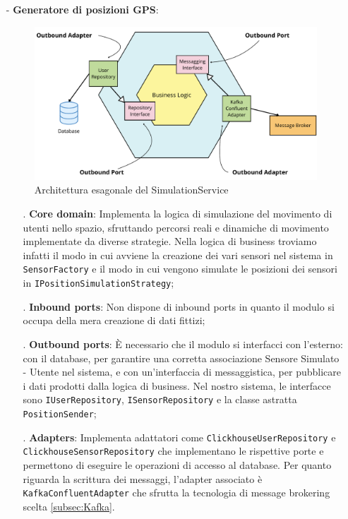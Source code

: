 \documentclass[10pt]{article}
\begin{document}
    \begin{itemize}
        \item[-] \textbf{Generatore di posizioni GPS}:
        \begin{figure}[h]
        \centering
        \includegraphics[width=\textwidth]{SimulationService.pdf}
        \caption{Architettura esagonale del SimulationService}
        \end{figure}
        \begin{itemize}
            \item[.] \textbf{Core domain}: Implementa la logica di simulazione del movimento di utenti nello spazio, sfruttando percorsi reali e dinamiche di movimento implementate da diverse strategie. Nella logica di business troviamo infatti il modo in cui avviene la creazione dei vari sensori nel sistema in \texttt{SensorFactory} e il modo in cui vengono simulate le posizioni dei sensori in \texttt{IPositionSimulationStrategy};
            \item[.] \textbf{Inbound ports}: Non dispone di inbound ports in quanto il modulo si occupa della mera creazione di dati fittizi;
            \item[.] \textbf{Outbound ports}: È necessario che il modulo si interfacci con l'esterno: con il database, per garantire una corretta associazione Sensore Simulato - Utente nel sistema, e con un'interfaccia di messaggistica, per pubblicare i dati prodotti dalla logica di business. Nel nostro sistema, le interfacce sono \texttt{IUserRepository}, \texttt{ISensorRepository} e la classe astratta \texttt{PositionSender};
            \sloppy
            \item[.] \textbf{Adapters}: Implementa adattatori come \texttt{ClickhouseUserRepository} e \texttt{ClickhouseSensorRepository} che implementano le rispettive porte e permettono di eseguire le operazioni di accesso al database. Per quanto riguarda la scrittura dei messaggi, l'adapter associato è \texttt{KafkaConfluentAdapter} che sfrutta la tecnologia di message brokering scelta \ref{subsec:Kafka}.
        \end{itemize}


\end{itemize}
\end{document}
